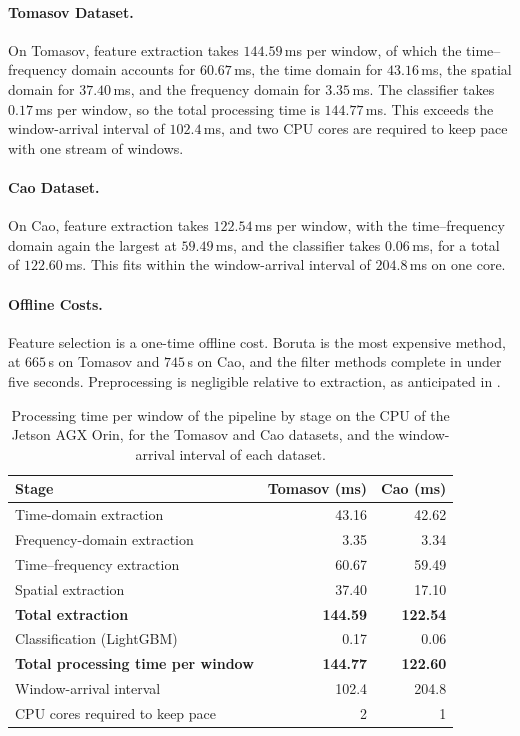 \paragraph[Tomasov Dataset]{Tomasov Dataset.}
On Tomasov, feature extraction takes $144.59$\,ms per window, of which the time--frequency domain accounts for $60.67$\,ms, the time domain for $43.16$\,ms, the spatial domain for $37.40$\,ms, and the frequency domain for $3.35$\,ms. The classifier takes $0.17$\,ms per window, so the total processing time is $144.77$\,ms. This exceeds the window-arrival interval of $102.4$\,ms, and two CPU cores are required to keep pace with one stream of windows.

\paragraph[Cao Dataset]{Cao Dataset.}
On Cao, feature extraction takes $122.54$\,ms per window, with the time--frequency domain again the largest at $59.49$\,ms, and the classifier takes $0.06$\,ms, for a total of $122.60$\,ms. This fits within the window-arrival interval of $204.8$\,ms on one core.

\paragraph[Offline Costs]{Offline Costs.}
Feature selection is a one-time offline cost. Boruta is the most expensive method, at $665$\,s on Tomasov and $745$\,s on Cao, and the filter methods complete in under five seconds. Preprocessing is negligible relative to extraction, as anticipated in .

\begin{table}[!htbp]
	\centering
	\caption{Processing time per window of the pipeline by stage on the CPU of the Jetson AGX Orin, for the Tomasov and Cao datasets, and the window-arrival interval of each dataset.}
	\label{tab:efficiency}
	\small
	\begin{tabular}{@{}lrr@{}}
		\toprule
		\textbf{Stage} & \textbf{Tomasov (ms)} & \textbf{Cao (ms)}\\
		\midrule
		Time-domain extraction        & 43.16 & 42.62\\
		Frequency-domain extraction   & 3.35  & 3.34\\
		Time--frequency extraction    & 60.67 & 59.49\\
		Spatial extraction            & 37.40 & 17.10\\
		\midrule
		\textbf{Total extraction}     & \textbf{144.59} & \textbf{122.54}\\
		Classification (LightGBM)     & 0.17  & 0.06\\
		\textbf{Total processing time per window} & \textbf{144.77} & \textbf{122.60}\\
		\midrule
		Window-arrival interval       & 102.4 & 204.8\\
		CPU cores required to keep pace & 2     & 1\\
		\bottomrule
	\end{tabular}
\end{table}

